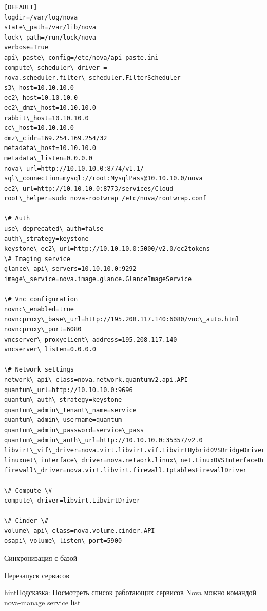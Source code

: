 \documentclass[letterpaper,10pt,russian]{sphinxmanual}
\begin{document}
\begin{Verbatim}[commandchars=\\\{\}]
[DEFAULT]
logdir=/var/log/nova
state\_path=/var/lib/nova
lock\_path=/run/lock/nova
verbose=True
api\_paste\_config=/etc/nova/api-paste.ini
compute\_scheduler\_driver = nova.scheduler.filter\_scheduler.FilterScheduler
s3\_host=10.10.10.0
ec2\_host=10.10.10.0
ec2\_dmz\_host=10.10.10.0
rabbit\_host=10.10.10.0
cc\_host=10.10.10.0
dmz\_cidr=169.254.169.254/32
metadata\_host=10.10.10.0
metadata\_listen=0.0.0.0
nova\_url=http://10.10.10.0:8774/v1.1/
sql\_connection=mysql://root:MysqlPass@10.10.10.0/nova
ec2\_url=http://10.10.10.0:8773/services/Cloud
root\_helper=sudo nova-rootwrap /etc/nova/rootwrap.conf

\# Auth
use\_deprecated\_auth=false
auth\_strategy=keystone
keystone\_ec2\_url=http://10.10.10.0:5000/v2.0/ec2tokens
\# Imaging service
glance\_api\_servers=10.10.10.0:9292
image\_service=nova.image.glance.GlanceImageService

\# Vnc configuration
novnc\_enabled=true
novncproxy\_base\_url=http://195.208.117.140:6080/vnc\_auto.html
novncproxy\_port=6080
vncserver\_proxyclient\_address=195.208.117.140
vncserver\_listen=0.0.0.0

\# Network settings
network\_api\_class=nova.network.quantumv2.api.API
quantum\_url=http://10.10.10.0:9696
quantum\_auth\_strategy=keystone
quantum\_admin\_tenant\_name=service
quantum\_admin\_username=quantum
quantum\_admin\_password=service\_pass
quantum\_admin\_auth\_url=http://10.10.10.0:35357/v2.0
libvirt\_vif\_driver=nova.virt.libvirt.vif.LibvirtHybridOVSBridgeDriver
linuxnet\_interface\_driver=nova.network.linux\_net.LinuxOVSInterfaceDriver
firewall\_driver=nova.virt.libvirt.firewall.IptablesFirewallDriver

\# Compute \#
compute\_driver=libvirt.LibvirtDriver

\# Cinder \#
volume\_api\_class=nova.volume.cinder.API
osapi\_volume\_listen\_port=5900
\end{Verbatim}

Синхронизация с базой


Перезапуск сервисов


\begin{notice}{hint}{Подсказка:}
Посмотреть список работающих сервисов Nova можно командой nova-manage service list
\end{notice}
\end{document}
